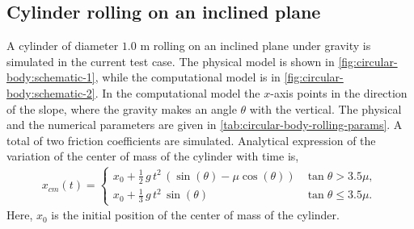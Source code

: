 \subsection{Cylinder rolling on an inclined plane}
\label{sec:cylinder-rolling-on-an-inclined-plane}
A cylinder of diameter $1.0$ m rolling on an inclined plane under gravity is
simulated in the current test case. The physical model is shown in
\cref{fig:circular-body:schematic-1}, while the computational model is in
\cref{fig:circular-body:schematic-2}. In the computational model the $x$-axis
points in the direction of the slope, where the gravity makes an angle $\theta$
with the vertical. The physical and the numerical parameters are given in
\cref{tab:circular-body-rolling-params}. A total of two friction coefficients
are simulated. Analytical expression of the variation of the center of mass of
the cylinder with time is,
\begin{align}
  \label{eq:analytical-x-cm-rolling-cylinder}
  x_{cm}(t) =
  \begin{cases}
  x_0 + \frac{1}{2} \, g \, t^2 \, (\sin(\theta) - \mu \cos(\theta)) & \tan{\theta} > 3.5\mu,\\
  x_0 + \frac{1}{3} \, g \, t^2 \, \sin(\theta) & \tan{\theta} \leq 3.5\mu.
\end{cases}
\end{align}
Here, $x_0$ is the initial position of the center of mass of the cylinder.
